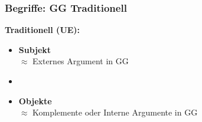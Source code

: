 \begin{frame}
\frametitle{Begriffe: GG \vs Traditionell}

	\begin{minipage}[b]{0.4\textwidth}
		\footnotesize
	\textbf{Traditionell (UE):}
		\begin{itemize}
		\item \textbf{Subjekt}\\
		$\approx$ Externes Argument in GG
		\item[]
		\item \alert{\textbf{Objekte}}\\
		$\approx$ Komplemente oder Interne Argumente in GG
		\end{itemize}	
  	\end{minipage}  
	\begin{minipage}[b]{0.55\textwidth}
		\begin{figure}
	\centering
	\end{figure}
  	\end{minipage}

\end{frame}


